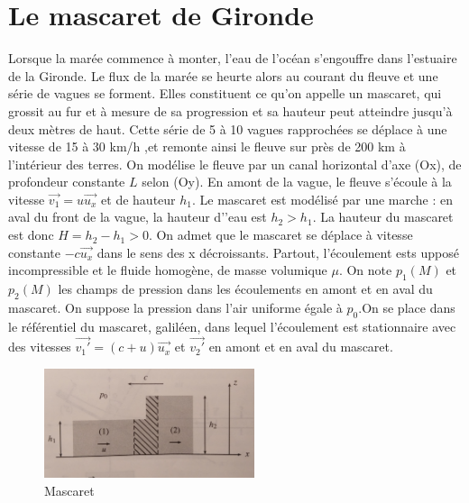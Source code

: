 \documentclass{article}
\begin{document}
\section{Le mascaret de Gironde}

Lorsque la marée commence à monter, l’eau de l’océan s’engouffre dans l’estuaire de la
Gironde. Le flux de la marée se heurte alors au courant du fleuve et une série de vagues se
forment. Elles constituent ce qu’on appelle un mascaret, qui grossit au fur et à mesure de  sa
progression et sa hauteur peut atteindre jusqu’à deux mètres de haut. Cette série de 5 à 10
vagues rapprochées se déplace à une vitesse de 15 à 30 km/h ,et remonte ainsi le fleuve sur
près de 200 km à l’intérieur des terres.
On modélise le fleuve par un canal horizontal d’axe (Ox), de profondeur constante $L$ selon
(Oy). En amont de la vague, le fleuve s’écoule à la vitesse $\vec{v_1} = u \vec{u_x}$ et de hauteur $h_1$.
Le mascaret est modélisé par une marche : en aval du front de la vague, la hauteur d'’eau
est $h_2>h_1$. La hauteur du mascaret est donc $H = h_2 - h_1 > 0$. On admet que le mascaret se déplace à vitesse constante 
$-c\vec{u_x}$ dans le sens des x décroissants. Partout, l'écoulement ests upposé incompressible et le fluide homogène, de masse 
volumique $\mu$. On note $p_1(M)$ et $p_2(M)$ les champs de pression dans les écoulements en amont et en aval du mascaret. 
On suppose la pression dans l'air uniforme égale à $p_0$.On se place dans le référentiel du mascaret, galiléen, dans lequel
l'écoulement est stationnaire avec des vitesses $\vec{v_1'} = (c+u)\vec{u_x}$ et $\vec{v_2'}$ en amont et en aval du mascaret. 
\begin{figure}[h]
  \centering
  \includegraphics[width=0.55\textwidth]{gironde.jpg}
  \caption{Mascaret}
  \label{fig:mascaret}
\end{figure}
\end{document}
